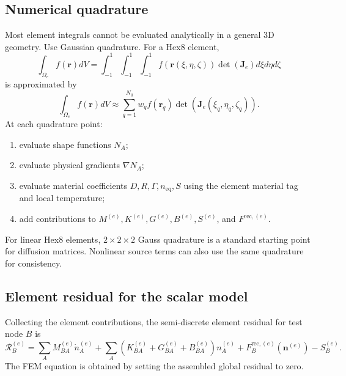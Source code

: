 \documentclass[11pt]{article}
\newcommand{\br}{{\bm{r}}}
\newcommand{\rec}{\mathrm{rec}}
\newcommand{\eq}{\mathrm{eq}}
\begin{document}
\subsection{Numerical quadrature}
Most element integrals cannot be evaluated analytically in a general 3D geometry. Use Gaussian quadrature. For a Hex8 element,
\begin{equation}
\int_{\Omega_e}f(\br)dV
=\int_{-1}^{1}\int_{-1}^{1}\int_{-1}^{1}f(\br(\xi,\eta,\zeta))\det(\bm{J}_e)d\xi d\eta d\zeta
\end{equation}
is approximated by
\begin{equation}
\int_{\Omega_e}f(\br)dV
\approx\sum_{q=1}^{N_q}w_q f(\br_q)\det(\bm{J}_e(\xi_q,\eta_q,\zeta_q)).
\end{equation}
At each quadrature point:
\begin{enumerate}[leftmargin=1.6em]
    \item evaluate shape functions $N_A$;
    \item evaluate physical gradients $\nabla N_A$;
    \item evaluate material coefficients $D,R,\Gamma,n_{\eq},S$ using the element material tag and local temperature;
    \item add contributions to $M^{(e)},K^{(e)},G^{(e)},B^{(e)},S^{(e)}$, and $F^{\rec,(e)}$.
\end{enumerate}
For linear Hex8 elements, $2\times2\times2$ Gauss quadrature is a standard starting point for diffusion matrices. Nonlinear source terms can also use the same quadrature for consistency.

\subsection{Element residual for the scalar model}
Collecting the element contributions, the semi-discrete element residual for test node $B$ is
\begin{equation}
\mathcal{R}_B^{(e)}
=\sum_A M_{BA}^{(e)}\dot n_A^{(e)}
+\sum_A\left(K_{BA}^{(e)}+G_{BA}^{(e)}+B_{BA}^{(e)}\right)n_A^{(e)}
+F_B^{\rec,(e)}(\bm{n}^{(e)})
-S_B^{(e)}.
\end{equation}
The FEM equation is obtained by setting the assembled global residual to zero.
\end{document}
